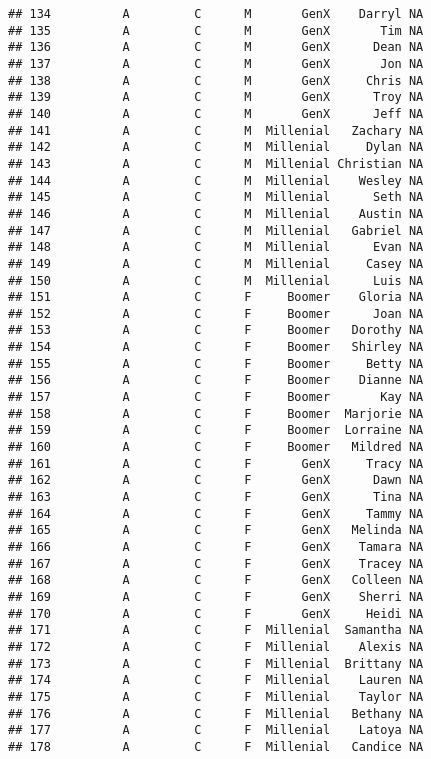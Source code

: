 \documentclass[
]{article}
\begin{document}
\begin{verbatim}
## 134          A         C      M       GenX    Darryl NA
## 135          A         C      M       GenX       Tim NA
## 136          A         C      M       GenX      Dean NA
## 137          A         C      M       GenX       Jon NA
## 138          A         C      M       GenX     Chris NA
## 139          A         C      M       GenX      Troy NA
## 140          A         C      M       GenX      Jeff NA
## 141          A         C      M  Millenial   Zachary NA
## 142          A         C      M  Millenial     Dylan NA
## 143          A         C      M  Millenial Christian NA
## 144          A         C      M  Millenial    Wesley NA
## 145          A         C      M  Millenial      Seth NA
## 146          A         C      M  Millenial    Austin NA
## 147          A         C      M  Millenial   Gabriel NA
## 148          A         C      M  Millenial      Evan NA
## 149          A         C      M  Millenial     Casey NA
## 150          A         C      M  Millenial      Luis NA
## 151          A         C      F     Boomer    Gloria NA
## 152          A         C      F     Boomer      Joan NA
## 153          A         C      F     Boomer   Dorothy NA
## 154          A         C      F     Boomer   Shirley NA
## 155          A         C      F     Boomer     Betty NA
## 156          A         C      F     Boomer    Dianne NA
## 157          A         C      F     Boomer       Kay NA
## 158          A         C      F     Boomer  Marjorie NA
## 159          A         C      F     Boomer  Lorraine NA
## 160          A         C      F     Boomer   Mildred NA
## 161          A         C      F       GenX     Tracy NA
## 162          A         C      F       GenX      Dawn NA
## 163          A         C      F       GenX      Tina NA
## 164          A         C      F       GenX     Tammy NA
## 165          A         C      F       GenX   Melinda NA
## 166          A         C      F       GenX    Tamara NA
## 167          A         C      F       GenX    Tracey NA
## 168          A         C      F       GenX   Colleen NA
## 169          A         C      F       GenX    Sherri NA
## 170          A         C      F       GenX     Heidi NA
## 171          A         C      F  Millenial  Samantha NA
## 172          A         C      F  Millenial    Alexis NA
## 173          A         C      F  Millenial  Brittany NA
## 174          A         C      F  Millenial    Lauren NA
## 175          A         C      F  Millenial    Taylor NA
## 176          A         C      F  Millenial   Bethany NA
## 177          A         C      F  Millenial    Latoya NA
## 178          A         C      F  Millenial   Candice NA

\end{verbatim}
\end{document}
